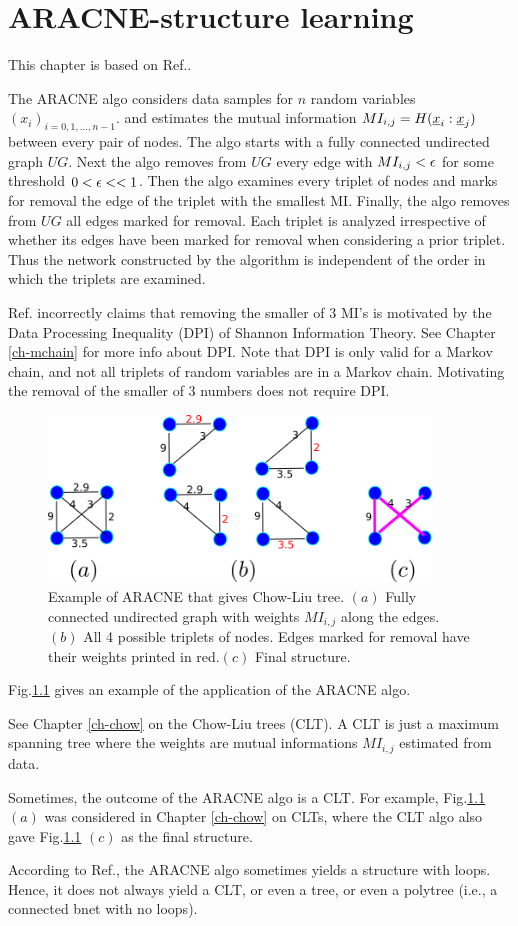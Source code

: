 \chapter{ARACNE-structure learning}
\label{ch-aracne}

This chapter
is based on
Ref.\cite{aracne}.


The ARACNE algo
considers data samples
for $n$ random variables
$(x_i)_{i=0, 1, \dots, n-1}$.
and estimates the mutual
information $MI_{i,j}=H({\underline{x}}_i:{\underline{x}}_j)$ between
every pair of nodes.
The algo 
starts with a fully connected
undirected graph $UG$.
Next the algo
removes from $UG$
every edge with $MI_{i,j}<\epsilon$
for some threshold $0<\epsilon<<1$.
Then the algo examines every
triplet of nodes and marks for removal 
the edge of the triplet
with the smallest MI.
Finally,
the algo removes from $UG$  all
edges marked for removal.
 Each triplet is analyzed
irrespective of whether its edges
 have been marked for
removal when considering a prior triplet.
Thus the network constructed by the 
algorithm is independent of the
 order in which the triplets are examined.

Ref.\cite{aracne} incorrectly claims that
removing the smaller of 3 MI's
is motivated by the Data Processing 
Inequality (DPI)
of Shannon Information Theory. 
See Chapter \ref{ch-mchain}
for more info about DPI.
Note that DPI is
only valid for a Markov chain,
and not all
 triplets of random variables
are in a Markov chain.
Motivating the removal of the smaller of 
3 numbers does not require DPI.

\begin{figure}[h!]
\centering
\includegraphics[width=4in]
{aracne/aracne.png}
\caption{
Example of ARACNE that gives Chow-Liu tree.
$(a)$ Fully connected 
undirected graph with
 weights $MI_{i,j}$
along the edges.
$(b)$ All 4 possible triplets of nodes.
Edges marked for removal 
have their weights
printed in red.$(c)$
Final structure.} 
\label{fig-aracne}
\end{figure}


Fig.\ref{fig-aracne}
gives an example 
of the application
of the ARACNE algo.

See Chapter \ref{ch-chow} on 
the Chow-Liu trees (CLT).
A CLT is just
a  maximum spanning tree
where the weights are 
mutual informations 
 $MI_{i,j}$
estimated from data.

Sometimes, the outcome
of the ARACNE algo is a CLT.
For example,
Fig.\ref{fig-aracne}
$(a)$
was considered
in Chapter \ref{ch-chow}
on CLTs, where
the CLT algo
also
gave 
Fig.\ref{fig-aracne}
$(c)$ as the final structure.

According to Ref.\cite{aracne}, the 
 ARACNE algo sometimes 
yields a structure with loops.
Hence, it does not always yield a CLT,
or even a tree, or even a polytree (i.e., 
a connected bnet with no loops).


